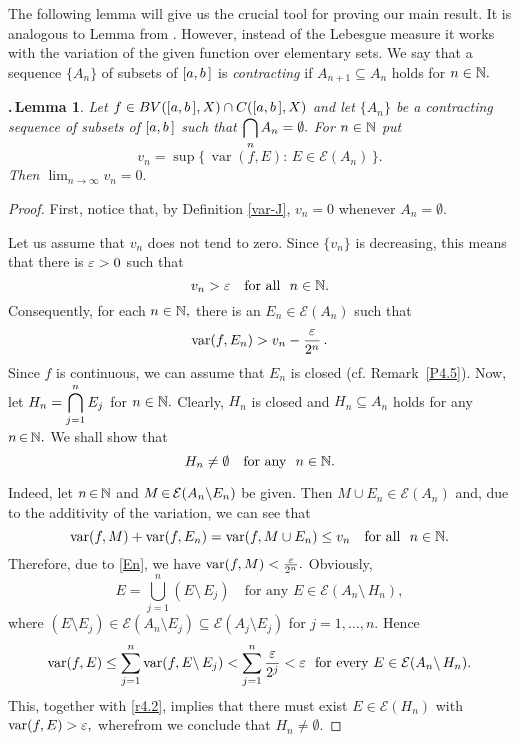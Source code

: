 \documentclass[12pt,twoside]{article}
\numberwithin{equation}{section}
\theoremstyle{plain}
\newtheorem{lemma}[theorem]{\hskip-1mm.\,Lemma}
\theoremstyle{definition}
\DeclareMathOperator{\var}{var}
\begin{document}
{\smallskip

The following lemma will give us the crucial tool for proving our main result.
It is analogous to Lemma from \cite{Lewin}. However, instead of the Lebesgue measure
it works with the variation of the given function over elementary sets. We say that
a sequence $\{A_n\}$ of subsets of $[a,b\,]$ is {\em contracting} if $A_{n+1}\subseteq A_n$
holds for $n\in{\mathbb N}.$

\smallskip

\begin{lemma}\label{measure}
Let $f\in BV([a,b\,],X)\cap C([a,b\,],X)$ and let $\{A_n\}$ be a contracting sequence
of subsets of $[a,b\,]$ such that $\displaystyle\bigcap_n A_n=\emptyset.$ For $n\in{\mathbb N}$
put
\begin{equation}\label{alpha}
   v_n=\sup\{\,\var(f,E){:}\,E\in\mathcal E(A_n)\,\}.
\end{equation}
Then \quad $\lim_{n\to\infty}v_n=0.$
\end{lemma}
\begin{proof} First, notice that, by Definition \ref{var-J}, $v_n=0$ whenever
$A_n=\emptyset.$

\smallskip

Let us assume that $v_n$ does not tend to zero. Since $\{v_n\}$ is
decreasing, this means that there is $\varepsilon>0$ such that
\begin{equation}\label{r4.2}
   v_n>\eps\quad\mbox{for all \ } n\in\N.
\end{equation}
Consequently, for each $n\in{\mathbb N},$ there is an $E_n\in\mathcal E(A_n)$ such that
\begin{equation}\label{En}
    \var(f,E_n)>v_n-\frac{\eps}{2^n}\,.
\end{equation}
Since $f$ is continuous, we can assume that $E_n$ is closed (cf. Remark~\ref{P4.5}).
Now, let $H_n=\displaystyle\bigcap_{j=1}^nE_j$ for $n\in{\mathbb N}.$ Clearly, $H_n$ is closed and
$H_n\subseteq A_n$ holds for any $n\,{\in}\,{\mathbb N}.$ We shall show that
\begin{equation*}\label{r4.3}
    H_n\ne\emptyset\quad\mbox{for any \ } n\in\N.
\end{equation*}

\smallskip

Indeed, let $n\,{\in}\,{\mathbb N}$ and $M\,{\in}\,\mathcal E(A_n{\setminus}E_n)$ be given. Then
$M\cup E_n\in\mathcal{E}(A_n)$ and, due to the additivity of the variation, we can
see that
\[
   \var(f,M)+\var(f,E_n)=\var(f,M\cup E_n)\le v_n
   \quad\mbox{for all \ } n\in\N.
\]
Therefore, due to \eqref{En}, we have $\var(f,M)<\frac{\eps}{2^n}.$  Obviously,
\[
   E=\bigcup_{j{=}1}^n (E{\setminus}\,E_j)
   \quad\mbox{for any \ } E\in\mathcal{E}(A_n{\setminus}\,H_n),
\]
where $(E\setminus E_j)\in\mathcal{E}(A_n{\setminus}E_j)
\subseteq\mathcal{E}(A_j{\setminus}E_j)$ for  $j=1,\dots,n.$ Hence
\[
   \var(f,E)\le\sum_{j{=}1}^n\var(f,E{\setminus}\,E_j)
            <\sum_{j{=}1}^n\dfrac{\eps}{2^j}<\eps
   \mbox{ \ for every $E\in\mathcal E(A_n{\setminus}\,H_n)$}.
\]
This, together with \eqref{r4.2}, implies that there must exist $E\in\mathcal E(H_n)$
with $\var(f,E)>\eps,$ wherefrom we conclude that $H_n\ne\emptyset.$


\end{proof}}
\end{document}
